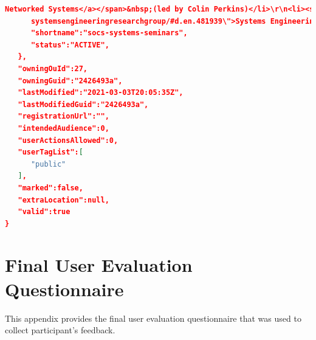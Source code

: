 \documentclass{l4proj}
\begin{document}
\begin{appendices}
\begin{lstlisting}[language=json, caption={Extract of JSON response from Samoa Events API.}]
      Networked Systems</a></span>&nbsp;(led by Colin Perkins)</li>\r\n<li><span><a href=\"../../schools/computing/research/researchoverview/
      systemsengineeringresearchgroup/#d.en.481939\">Systems Engineering</a></span><span>&nbsp;(led by Tim Storer)</span></li>\r\n</ul>\r\n<p>Much of the research we undertake is collaborative and has industrial partners. We work closely with other groups in Computing Science as well as other schools including Engineering. We also work closely with other world leading Universities and many private and public sector organisations (recently: Airbus, Cisco Systems, EDF, Ericsson, GCHQ, IETF, Microsoft Research, NASA).</p>\r\n<p>Systems seminars are usually held on Wednesdays. Everyone from the University of Glasgow and beyond is welcome to attend these talks - see the Events tab for more details. We are happy to hear from anyone that would like to visit us to give a talk.</p>\r\n<p>The Systems seminar coordinators are Natalia Chechina and Magnus Morton.</p>",
      "shortname":"socs-systems-seminars",
      "status":"ACTIVE",
   },
   "owningOuId":27,
   "owningGuid":"2426493a",
   "lastModified":"2021-03-03T20:05:35Z",
   "lastModifiedGuid":"2426493a",
   "registrationUrl":"",
   "intendedAudience":0,
   "userActionsAllowed":0,
   "userTagList":[
      "public"
   ],
   "marked":false,
   "extraLocation":null,
   "valid":true
}
\end{lstlisting}


\chapter{Final User Evaluation Questionnaire}
\label{appendix:final_evaluation_questionnaire}

This appendix provides the final user evaluation questionnaire that was used to collect participant's feedback.


\end{appendices}
\end{document}

